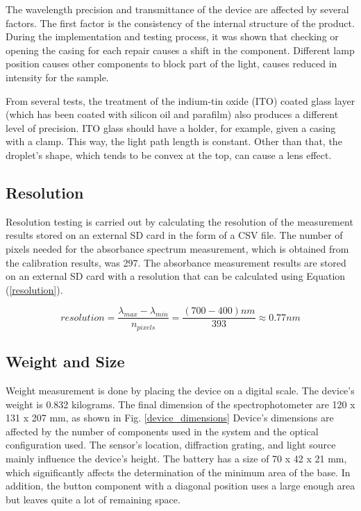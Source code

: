 \documentclass[conference]{IEEEtran}
\begin{document}
The wavelength precision and transmittance of the device are affected by several factors. 
The first factor is the consistency of the internal structure of the product.
During the implementation and testing process, it was shown that checking or opening the casing for each repair causes a shift in the component. 
Different lamp position causes other components to block part of the light, causes reduced in intensity for the sample.

From several tests, the treatment of the indium-tin oxide (ITO) coated glass layer (which has been coated with silicon oil and parafilm) also produces a different level of precision. 
ITO glass should have a holder, for example, given a casing with a clamp. 
This way, the light path length is constant. Other than that, the droplet's shape, which tends to be convex at the top, can cause a lens effect\cite{b5}.
    
\subsection{Resolution}
Resolution testing is carried out by calculating the resolution of the measurement results stored on an external SD card in the form of a CSV file.
The number of pixels needed for the absorbance spectrum measurement, which is obtained from the calibration results, was 297.
The absorbance measurement results are stored on an external SD card with a resolution that can be calculated using Equation (\ref{resolution}).

    \begin{equation}
    resolution=\frac{\lambda_{max} - \lambda_{min}}{n_{pixels}}=\frac{(700 - 400)nm}{393}\approx0.77nm
    \label{resolution}
    \end{equation}

\subsection{Weight and Size}
Weight measurement is done by placing the device on a digital scale.
The device's weight is 0.832 kilograms. 
The final dimension of the spectrophotometer are 120 x 131 x 207 mm, as shown in Fig. \ref{device_dimensions}
Device's dimensions are affected by the number of components used in the system and the optical configuration used. 
The sensor's location, diffraction grating, and light source mainly influence the device's height. 
The battery has a size of 70 x 42 x 21 mm, which significantly affects the determination of the minimum area of the base.
In addition, the button component with a diagonal position uses a large enough area but leaves quite a lot of remaining space.
\end{document}
